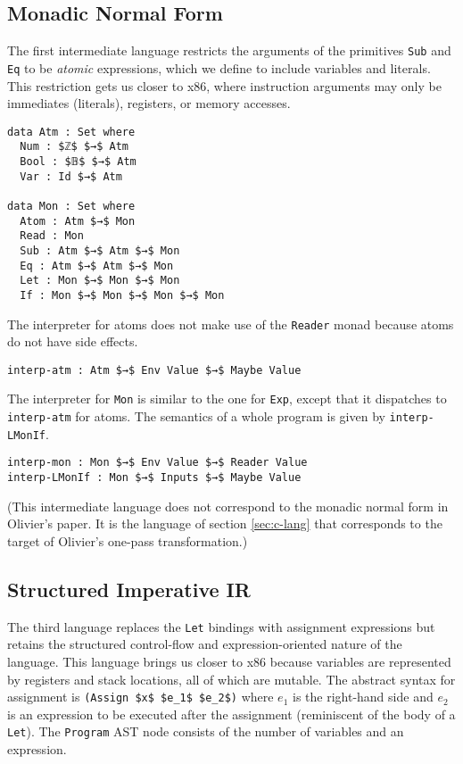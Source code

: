\documentclass[sigplan,review,dvipsnames,screen,10pt]{acmart}
\begin{document}
\subsection{Monadic Normal Form}

The first intermediate language restricts the arguments of the
primitives \lstinline{Sub} and \lstinline{Eq} to be \emph{atomic}
expressions, which we define to include variables and literals. This
restriction gets us closer to x86, where instruction arguments may
only be immediates (literals), registers, or memory accesses.

\begin{lstlisting}
data Atm : Set where
  Num : $ℤ$ $→$ Atm 
  Bool : $𝔹$ $→$ Atm 
  Var : Id $→$ Atm

data Mon : Set where
  Atom : Atm $→$ Mon
  Read : Mon
  Sub : Atm $→$ Atm $→$ Mon
  Eq : Atm $→$ Atm $→$ Mon
  Let : Mon $→$ Mon $→$ Mon
  If : Mon $→$ Mon $→$ Mon $→$ Mon
\end{lstlisting}

The interpreter for atoms does not make use of the \lstinline{Reader}
monad because atoms do not have side effects.

\begin{lstlisting}
interp-atm : Atm $→$ Env Value $→$ Maybe Value
\end{lstlisting}

The interpreter for \lstinline{Mon} is similar to the
one for \lstinline{Exp}, except that it dispatches
to \lstinline{interp-atm} for atoms. The semantics
of a whole program is given by \lstinline{interp-LMonIf}.

\begin{lstlisting}
interp-mon : Mon $→$ Env Value $→$ Reader Value
interp-LMonIf : Mon $→$ Inputs $→$ Maybe Value
\end{lstlisting}

(This intermediate language does not correspond to the monadic normal
form in Olivier's paper. It is the language of section
\ref{sec:c-lang} that corresponds to the target of Olivier's one-pass
transformation.)

\subsection{Structured Imperative IR}
\label{sec:imp}

The third language replaces the \lstinline{Let} bindings with
assignment expressions but retains the structured control-flow and
expression-oriented nature of the language. This language brings us
closer to x86 because variables are represented by registers and stack
locations, all of which are mutable. The abstract syntax for
assignment is \lstinline{(Assign $x$ $e_1$ $e_2$)} where $e_1$ is the
right-hand side and $e_2$ is an expression to be executed after the
assignment (reminiscent of the body of a \lstinline{Let}).  The
\lstinline{Program} AST node consists of the number of variables and
an expression.
\end{document}
